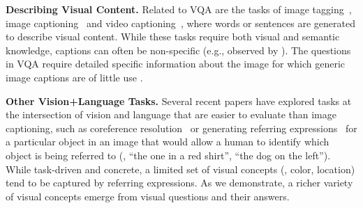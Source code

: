 \textbf{Describing Visual Content.}
Related to VQA are the tasks of image tagging~\cite{deng,AlexNet}, image
captioning~\cite{babytalk,FarhadiSentencesECCV2010,MitchellEtAl12,captioning_xinlei,captioning_msr,captioning_google,captioning_berkeley,captioning_stanford,captioning_baidu_ucla,captioning_toronto} and video captioning~\cite{video,youtube2text}, where words or sentences are
generated to describe visual content. While these tasks require both visual and semantic knowledge,
captions can often be non-specific (e.g., observed by \cite{captioning_google}). %
The questions in VQA require detailed specific information about the image for which generic
image captions are of little use \cite{vizwiz}.

\textbf{Other Vision+Language Tasks.} Several recent papers have explored tasks at the intersection of vision and language
that are easier to evaluate than image captioning,
such as
coreference resolution~\cite{nounCoref2014,peopleCoref2014}
or generating referring expressions~\cite{referit,mitchell2013generating}  %
for a particular object in an image that would allow a human to identify
which object is being referred to (\eg, ``the one in a red shirt'',
``the dog on the left'').
While task-driven and concrete, a limited set of visual concepts
(\eg, color, location) tend to be captured by referring expressions. As we demonstrate, a
richer variety of visual concepts emerge from visual questions and their answers.
